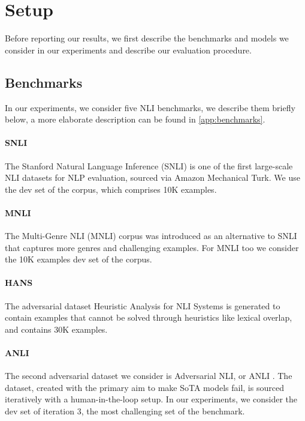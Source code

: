 \section{Setup}

Before reporting our results, we first describe the benchmarks and models we consider in our experiments and describe our evaluation procedure.

\subsection{Benchmarks}
In our experiments, we consider five NLI benchmarks, we describe them briefly below, a more elaborate description can be found in \cref{app:benchmarks}. 

\vspace{-1mm}
\paragraph{SNLI}
The Stanford Natural Language Inference (SNLI) is one of the first large-scale NLI datasets for NLP evaluation, sourced via Amazon Mechanical Turk.
We use the dev set of the corpus, which comprises 10K examples.

\vspace{-1mm}
\paragraph{MNLI}
The Multi-Genre NLI (MNLI) corpus \citep{williams-etal-2018-broad} was introduced as an alternative to SNLI that captures more genres and challenging examples. For MNLI too we consider the 10K examples dev set of the corpus.

\vspace{-1mm}
\paragraph{HANS}
The adversarial dataset Heuristic Analysis for NLI Systems \citep[HANS,][]{mccoy-etal-2019-right} is generated to contain examples that cannot be solved through heuristics like lexical overlap, and contains 30K examples.

\vspace{-1mm}
\paragraph{ANLI}
The second adversarial dataset we consider is Adversarial NLI, or ANLI \citep{nie-etal-2020-adversarial}.
The dataset, created with the primary aim to make SoTA models fail, is sourced iteratively with a human-in-the-loop setup.
In our experiments, we consider the dev set of iteration 3, the most challenging set of the benchmark.

